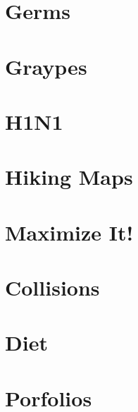 \documentclass[a4paper, 10pt]{article}
\let\stdsection\section
\renewcommand\section{\newpage\stdsection}
\newcommand{\includecode}[1]{
    }
\newcommand{\algoAuthor}{2} %
\begin{document}
    \section{Germs}
        \label{sec:germs}
        \includecode{../problems/w07/Germs/Germs\algoAuthor.cpp}
        
    \section{Graypes}
        \label{sec:graypes}
        \includecode{../problems/w07/Graypes/Graypes\algoAuthor.cpp}
        
    \section{H1N1}
        \label{sec:h1n1}
        \includecode{../problems/w07/H1N1/H1N1_\algoAuthor.cpp}
    
    \section{Hiking Maps}
        \label{sec:hiking_maps}
        \includecode{../problems/w07/HikingMaps/HikingMaps\algoAuthor.cpp}
    
    
    \section{Maximize It!}
        \label{sec:maximize_it}
        \includecode{../problems/w08/Maximize_It/MaximizeIt\algoAuthor.cpp}
        
    \section{Collisions}
        \label{sec:collisions}
        \includecode{../problems/w08/Collisions/Collisions\algoAuthor.cpp}
        
    \section{Diet}
        \label{sec:diet}
        \includecode{../problems/w08/Diet/Diet\algoAuthor.cpp}
        
    \section{Porfolios}
        \label{sec:portfolios}
        \includecode{../problems/w08/Portfolios/Portfolios\algoAuthor.cpp}
    
\end{document}
